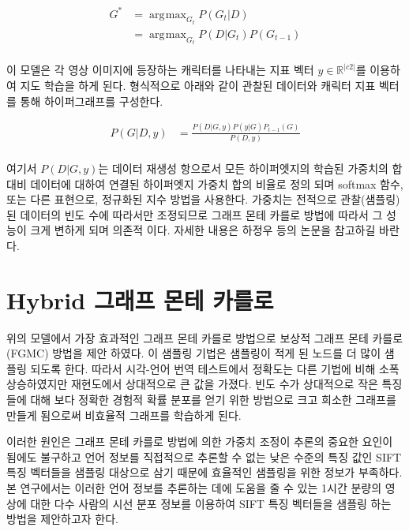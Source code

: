 \documentclass{kcc}
\DeclareMathOperator*{\argmax}{\arg\!\max}
\begin{document}
\begin{equation} \label{eq1}
\begin{split}
G^{*} & = \argmax_{G_{t}} P(G_{t}|D) \\
      & = \argmax_{G_{t}} P(D|G_{t})P(G_{t-1}) \\
\end{split}
\end{equation}

이 모델은 각 영상 이미지에 등장하는 캐릭터를 나타내는 지표 벡터 $y \in \mathds{R}^{|c2|}$를 이용하여 지도 학습을 하게 된다. 형식적으로 아래와 같이 관찰된 데이터와 캐릭터 지표 벡터를 통해 하이퍼그래프를 구성한다.

\begin{equation} \label{eq2}
\begin{split}
P(G|D,y) & = \frac{P(D|G,y) P(y|G) P_{t-1}(G)} {P(D,y)} \\
\end{split}
\end{equation}

여기서 $P(D|G,y)$는 데이터 재생성 항으로서 모든 하이퍼엣지의 학습된 가중치의 합 대비 데이터에 대하여 연결된 하이퍼엣지 가중치 합의 비율로 정의 되며 softmax 함수, 또는 다른 표현으로, 정규화된 지수 방법을 사용한다. 가중치는 전적으로 관찰(샘플링) 된 데이터의 빈도 수에 따라서만 조정되므로 그래프 몬테 카를로 방법에 따라서 그 성능이 크게 변하게 되며 의존적 이다\cite{zhang1994accelerated,Zhang1998}. 자세한 내용은 하정우 등\cite{Ha2015}의 논문을 참고하길 바란다.

\section{Hybrid 그래프 몬테 카를로}
위의 모델에서 가장 효과적인 그래프 몬테 카를로 방법으로 보상적 그래프 몬테 카를로(FGMC) 방법을 제안 하였다. 이 샘플링 기법은 샘플링이 적게 된 노드를 더 많이 샘플링 되도록 한다. 따라서 시각-언어 번역 테스트에서 정확도는 다른 기법에 비해 소폭 상승하였지만 재현도에서 상대적으로 큰 값을 가졌다. 빈도 수가 상대적으로 작은 특징들에 대해 보다 정확한 경험적 확률 분포를 얻기 위한 방법으로 크고 희소한 그래프를 만들게 됨으로써 비효율적 그래프를 학습하게 된다.

이러한 원인은 그래프 몬테 카를로 방법에 의한 가중치 조정이 추론의 중요한 요인이 됨에도 불구하고 언어 정보를 직접적으로 추론할 수 없는 낮은 수준의 특징 값인 SIFT 특징 벡터들을 샘플링 대상으로 삼기 때문에 효율적인 샘플링을 위한 정보가 부족하다. 본 연구에서는 이러한 언어 정보를 추론하는 데에 도움을 줄 수 있는 1시간 분량의 영상에 대한 다수 사람의 시선 분포 정보를 이용하여 SIFT 특징 벡터들을 샘플링 하는 방법을 제안하고자 한다.
\end{document}
